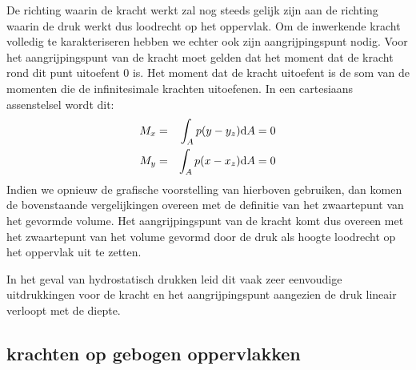 De richting waarin de kracht werkt zal nog steeds gelijk zijn aan de richting waarin de druk werkt dus loodrecht op het oppervlak. Om de inwerkende kracht volledig te karakteriseren hebben we echter ook zijn aangrijpingspunt nodig. Voor het aangrijpingspunt van de kracht moet gelden dat het moment dat de kracht rond dit punt uitoefent 0 is. Het moment dat de kracht uitoefent is de som van de momenten die de infinitesimale krachten uitoefenen. In een cartesiaans assenstelsel wordt dit:
\begin{eqnarray}
	M_x &=& \int_A  p (y-y_z)  \mathrm{d} A = 0 \\
	M_y &=& \int_A  p (x-x_z)  \mathrm{d} A = 0
\end{eqnarray}
Indien we opnieuw de grafische voorstelling van hierboven gebruiken, dan komen de bovenstaande vergelijkingen overeen met de definitie van het zwaartepunt van het gevormde volume. Het aangrijpingspunt van de kracht komt dus overeen met het zwaartepunt van het volume gevormd door de druk als hoogte loodrecht op het oppervlak uit te zetten.

In het geval van hydrostatisch drukken leid dit vaak zeer eenvoudige uitdrukkingen voor de kracht en het aangrijpingspunt aangezien de druk lineair verloopt met de diepte.

		\subsection{krachten op gebogen oppervlakken}


